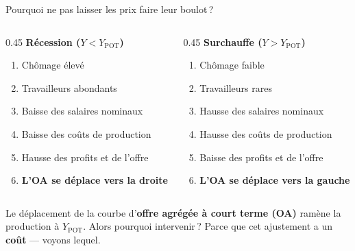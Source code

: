 \documentclass[aspectratio=169]{beamer}
\begin{document}
\begin{frame}[t]{Pourquoi ne pas laisser les prix faire leur boulot\,?}\examtag
   \footnotesize
   \vspace{0.25cm}
   \begin{columns}[T]
      \begin{column}{0.45\textwidth}
         \textbf{\textcolor{HECnavy}{Récession} ($Y < Y_{\text{POT}}$)}
         \vspace{0.05cm}
         \begin{enumerate}
            \setlength\itemsep{0.05cm}
            \item Chômage élevé
            \item Travailleurs abondants
            \item Baisse des salaires nominaux
            \item Baisse des coûts de production
            \item Hausse des profits et de l'offre
            \item[\textcolor{HECnavy}{$\to$}] \textbf{L’OA se déplace vers la droite}
         \end{enumerate}
      \end{column}
      \begin{column}{0.45\textwidth}
         \textbf{\textcolor{HECcoral}{Surchauffe} ($Y > Y_{\text{POT}}$)}
         \vspace{0.05cm}
         \begin{enumerate}
            \setlength\itemsep{0.05cm}
            \item Chômage faible
            \item Travailleurs rares
            \item Hausse des salaires nominaux
            \item Hausse des coûts de production
            \item Baisse des profits et de l'offre
            \item[\textcolor{HECcoral}{$\to$}] \textbf{L’OA se déplace vers la gauche}
         \end{enumerate}
      \end{column}
   \end{columns}
   \vspace{0.1cm}
   \begin{keyinsight}
      Le déplacement de la courbe d’\textbf{offre agrégée à court terme (OA)} ramène la production à $Y_{\text{POT}}$. Alors pourquoi intervenir\,? Parce que cet ajustement a un \textbf{coût} --- voyons lequel.
   \end{keyinsight}
\end{frame}
\end{document}
